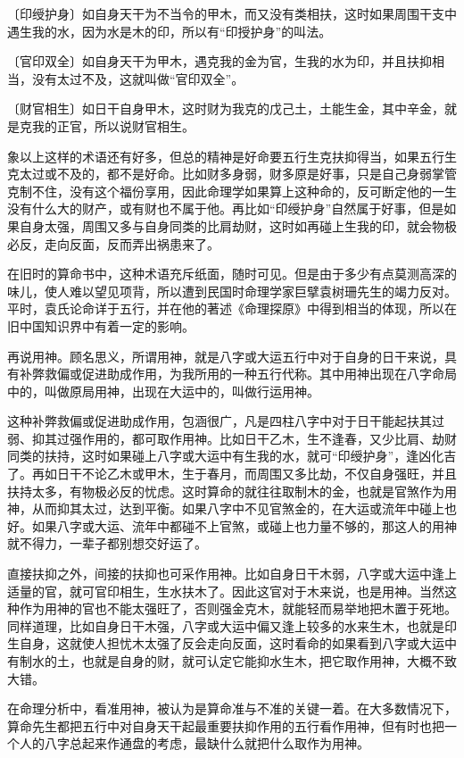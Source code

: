 \documentclass[a5paper,oneside,12pt]{ctexbook}
\begin{document}
〔印绶护身〕如自身天干为不当令的甲木，而又没有类相扶，这时如果周围干支中遇生我的水，因为水是木的印，所以有“印授护身”的叫法。

〔官印双全〕如自身天干为甲木，遇克我的金为官，生我的水为印，并且扶抑相当，没有太过不及，这就叫做“官印双全”。

〔财官相生〕如日干自身甲木，这时财为我克的戊己土，土能生金，其中辛金，就是克我的正官，所以说财官相生。

象以上这样的术语还有好多，但总的精神是好命要五行生克扶抑得当，如果五行生克太过或不及的，都不是好命。比如财多身弱，财多原是好事，只是自己身弱掌管克制不住，没有这个福份享用，因此命理学如果算上这种命的，反可断定他的一生没有什么大的财产，或有财也不属于他。再比如“印绶护身”自然属于好事，但是如果自身太强，周围又多与自身同类的比肩劫财，这时如再碰上生我的印，就会物极必反，走向反面，反而弄出祸患来了。

在旧时的算命书中，这种术语充斥纸面，随时可见。但是由于多少有点莫测高深的味儿，使人难以望见项背，所以遭到民国时命理学家巨擘袁树珊先生的竭力反对。平时，袁氏论命详于五行，并在他的著述《命理探原》中得到相当的体现，所以在旧中国知识界中有着一定的影响。

再说用神。顾名思义，所谓用神，就是八字或大运五行中对于自身的日干来说，具有补弊救偏或促进助成作用，为我所用的一种五行代称。其中用神出现在八字命局中的，叫做原局用神，出现在大运中的，叫做行运用神。

这种补弊救偏或促进助成作用，包涵很广，凡是四柱八字中对于日干能起扶其过弱、抑其过强作用的，都可取作用神。比如日干乙木，生不逢春，又少比肩、劫财同类的扶持，这时如果碰上八字或大运中有生我的水，就可“印绶护身”，逢凶化吉了。再如日干不论乙木或甲木，生于春月，而周围又多比劫，不仅自身强旺，并且扶持太多，有物极必反的忧虑。这时算命的就往往取制木的金，也就是官煞作为用神，从而抑其太过，达到平衡。如果八字中不见官煞金的，在大运或流年中碰上也好。如果八字或大运、流年中都碰不上官煞，或碰上也力量不够的，那这人的用神就不得力，一辈子都别想交好运了。

直接扶抑之外，间接的扶抑也可采作用神。比如自身日干木弱，八字或大运中逢上适量的官，就可官印相生，生水扶木了。因此这官对于木来说，也是用神。当然这种作为用神的官也不能太强旺了，否则强金克木，就能轻而易举地把木置于死地。同样道理，比如自身日干木强，八字或大运中偏又逢上较多的水来生木，也就是印生自身，这就使人担忧木太强了反会走向反面，这时看命的如果看到八字或大运中有制水的土，也就是自身的财，就可认定它能抑水生木，把它取作用神，大概不致大错。

在命理分析中，看准用神，被认为是算命准与不准的关键一着。在大多数情况下，算命先生都把五行中对自身天干起最重要扶抑作用的五行看作用神，但有时也把一个人的八字总起来作通盘的考虑，最缺什么就把什么取作为用神。
\end{document}
